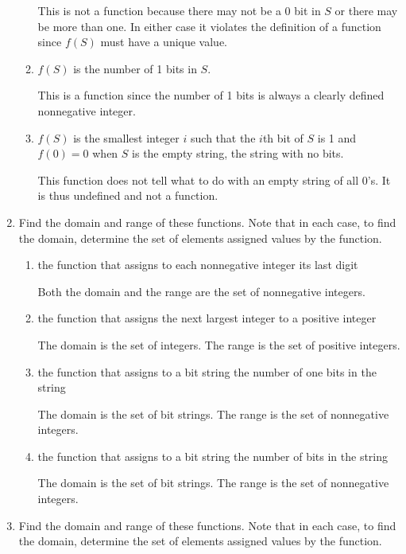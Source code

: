 \documentclass[11pt]{article}
\begin{document}
\begin{enumerate}[label=\textbf{\arabic*.}]
\begin{enumerate}[label=\textbf{\alph*)}]
		This is not a function because there may not be a 0 bit in $S$ or there may be more than one. In either case it violates the definition of a function since $f(S)$ must have a unique value.
		
		\item $f(S)$ is the number of 1 bits in $S$.
		
		This is a function since the number of 1 bits is always a clearly defined nonnegative integer.
		
		\item $f(S)$ is the smallest integer $i$ such that the $i$th bit of $S$ is 1 and $f(0) = 0$ when $S$ is the empty string, the string with no bits.
		
		This function does not tell what to do with an empty string of all 0's. It is thus undefined and not a function.
	\end{enumerate}

	\item Find the domain and range of these functions. Note that in each case, to find the domain, determine the set of elements assigned values by the function.
	
	\begin{enumerate}[label=\textbf{\alph*)}]
		\item the function that assigns to each nonnegative integer its last digit
		
		Both the domain and the range are the set of nonnegative integers.
		
		\item the function that assigns the next largest integer to a positive integer
		
		The domain is the set of integers. The range is the set of positive integers.
		
		\item the function that assigns to a bit string the number of one bits in the string
		
		The domain is the set of bit strings. The range is the set of nonnegative integers.
		
		\item the function that assigns to a bit string the number of bits in the string
		
		The domain is the set of bit strings. The range is the set of nonnegative integers.
	\end{enumerate}

	\item Find the domain and range of these functions. Note that in each case, to find the domain, determine the set of elements assigned values by the function.
	

\end{enumerate}
\end{document}
